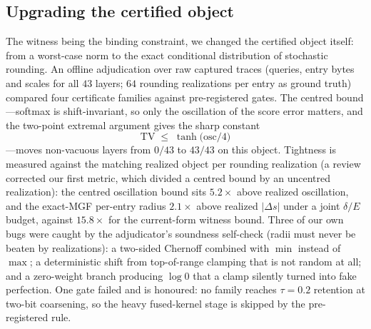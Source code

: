 \documentclass[11pt]{article}
\begin{document}
\subsection{Upgrading the certified object}
The witness being the binding constraint, we changed the certified object itself:
from a worst-case norm to the exact conditional distribution of stochastic
rounding. An offline adjudication over raw captured traces (queries, entry bytes
and scales for all $43$ layers; $64$ rounding realizations per entry as
ground truth) compared four certificate families against pre-registered gates.
The centred bound---softmax is shift-invariant, so only the oscillation of the
score error matters, and the two-point extremal argument gives the sharp constant
\begin{equation}
\mathrm{TV} \;\le\; \tanh\!\bigl(\mathrm{osc}/4\bigr)
\label{eq:tanhbound}
\end{equation}
---moves non-vacuous layers from
$0/43$ to $43/43$ on this object. Tightness is measured against the
matching realized object per rounding realization (a review corrected our first
metric, which divided a centred bound by an uncentred realization): the centred
oscillation bound sits $5.2\times$ above realized oscillation, and the exact-MGF
per-entry radius $2.1\times$ above realized $|\Delta s|$ under a joint
$\delta/E$ budget, against $15.8\times$ for the current-form witness bound. Three of our own bugs were
caught by the adjudicator's soundness self-check (radii must never be beaten by
realizations): a two-sided Chernoff combined with $\min$ instead of
$\max$; a deterministic shift from top-of-range clamping that is not random at
all; and a zero-weight branch producing $\log 0$ that a clamp silently turned
into fake perfection. One gate failed and is honoured: no family reaches
$\tau{=}0.2$ retention at two-bit coarsening, so the heavy fused-kernel stage
is skipped by the pre-registered rule.
\end{document}
